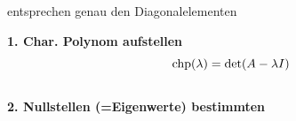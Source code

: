 \documentclass[a4paper]{article}
\begin{document}
		\begin{multicols}{2}
		\begin{fmerke}
				\vspace{1mm}
			entsprechen genau den Diagonalelementen
				\vspace{1mm}
		\end{fmerke}

		\begin{fmerke}
			\textbf{1. Char. Polynom aufstellen}
				\vspace{-2mm}
				$$\text{chp}(\lambda) = \det(A-\lambda I)$$\\[-6mm]
			\textbf{2. Nullstellen (=Eigenwerte) bestimmten}
		\end{fmerke}
		\end{multicols}

% 
		
\end{document}
